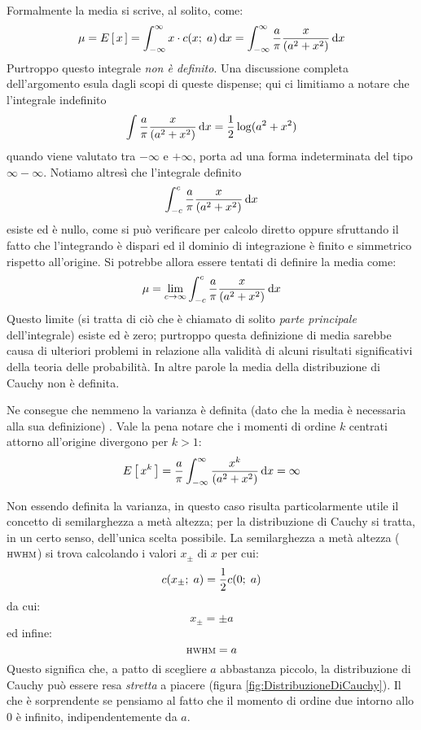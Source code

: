 Formalmente la media  si scrive,
al solito, come:
$$
\mu = \expect{x} = \dintegral{x \cdot \cauchypdf{x}{a}}{x}{-\infty}{\infty} =
\dintegral{\frac{a}{\pi} \frac{x}{(a^2 + x^2)}}{x}{-\infty}{\infty}
$$
Purtroppo questo integrale \emph{non \`e definito}.
Una discussione completa dell'argomento esula dagli scopi di queste dispense;
qui ci limitiamo a notare che l'integrale indefinito
$$
\iintegral{\frac{a}{\pi} \frac{x}{(a^2 + x^2)}}{x} =
\frac{1}{2} \log (a^2 + x^2)
$$
quando viene valutato tra $-\infty$ e $+\infty$, porta ad una forma
indeterminata del tipo $\infty - \infty$. 
Notiamo altres\`i che l'integrale definito
$$
\dintegral{\frac{a}{\pi} \frac{x}{(a^2 + x^2)}}{x}{-c}{c}
$$
esiste ed \`e nullo, come si pu\`o verificare per calcolo diretto oppure
sfruttando il fatto che l'integrando \`e dispari ed il dominio di integrazione
\`e finito e simmetrico rispetto all'origine. Si potrebbe allora essere
tentati di definire la media come:
$$
\mu = \lim_{c \rightarrow \infty}
\dintegral{\frac{a}{\pi} \frac{x}{(a^2 + x^2)}}{x}{-c}{c}
$$
Questo limite (si tratta di ci\`o che \`e chiamato di solito
\emph{parte principale} dell'integrale) esiste ed \`e zero; purtroppo questa
definizione di media sarebbe causa di ulteriori problemi in relazione alla
validit\`a di alcuni risultati significativi della teoria delle probabilit\`a.
In altre parole la media della distribuzione di Cauchy non \`e definita.

Ne consegue che nemmeno la varianza \`e definita (dato che la media \`e
necessaria alla sua definizione)
.
Vale la pena notare che i momenti di ordine $k$ centrati attorno all'origine
divergono per $k>1$:
$$
\expect{x^k} =
\frac{a}{\pi} \dintegral{\frac{x^k}{(a^2 + x^2)}}{x}{-\infty}{\infty}  = \infty
$$

Non essendo definita la varianza, in questo caso risulta particolarmente utile
il concetto di semilarghezza a met\`a altezza; per la distribuzione di Cauchy
si tratta, in un certo senso, dell'unica scelta possibile. La semilarghezza a
met\`a altezza ($\hwhm$)  si trova
calcolando i valori $x_{\pm}$ di $x$ per cui:
$$
\cauchypdf{x_{\pm}}{a} = \frac{1}{2} \cauchypdf{0}{a}
$$
da cui:
$$
x_{\pm} = \pm a
$$
ed infine:
$$
\hwhm = a
$$
Questo significa che, a patto di scegliere $a$ abbastanza piccolo, la
distribuzione di Cauchy pu\`o essere resa \emph{stretta} a piacere
(figura \ref{fig:DistribuzioneDiCauchy}).
Il che \`e sorprendente se pensiamo al fatto che il momento di ordine due
intorno allo $0$ \`e infinito, indipendentemente da $a$.

